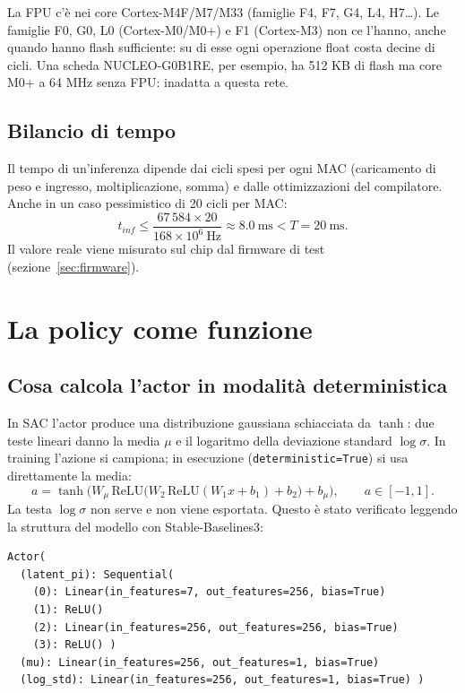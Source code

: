 \documentclass[11pt,a4paper]{article}
\newcommand{\code}[1]{\texttt{\small #1}}
\begin{document}
\begin{nota}
La FPU c'è nei core Cortex-M4F/M7/M33 (famiglie F4, F7, G4, L4, H7\dots). Le famiglie F0, G0, L0
(Cortex-M0/M0+) e F1 (Cortex-M3) non ce l'hanno, anche quando hanno flash sufficiente: su di esse
ogni operazione float costa decine di cicli. Una scheda NUCLEO-G0B1RE, per esempio, ha 512 KB di flash
ma core M0+ a 64 MHz senza FPU: inadatta a questa rete.
\end{nota}

\subsection{Bilancio di tempo}
Il tempo di un'inferenza dipende dai cicli spesi per ogni MAC (caricamento di peso e ingresso,
moltiplicazione, somma) e dalle ottimizzazioni del compilatore. Anche in un caso pessimistico di
20 cicli per MAC:
\begin{equation}
t_{inf} \le \frac{67\,584 \times 20}{168\times10^{6}\ \text{Hz}} \approx 8.0\ \text{ms} < T = 20\ \text{ms}.
\end{equation}
Il valore reale viene misurato sul chip dal firmware di test (sezione~\ref{sec:firmware}).

\section{La policy come funzione}

\subsection{Cosa calcola l'actor in modalità deterministica}
In SAC l'actor produce una distribuzione gaussiana schiacciata da $\tanh$: due teste lineari danno la
media $\mu$ e il logaritmo della deviazione standard $\log\sigma$. In training l'azione si campiona;
in esecuzione (\code{deterministic=True}) si usa direttamente la media:
\begin{equation}
a = \tanh\!\Big(W_\mu\,\mathrm{ReLU}\big(W_2\,\mathrm{ReLU}(W_1 x + b_1) + b_2\big) + b_\mu\Big), \qquad a\in[-1,1].
\end{equation}
La testa $\log\sigma$ non serve e non viene esportata. Questo è stato verificato leggendo la struttura
del modello con Stable-Baselines3:
\begin{lstlisting}[style=sh]
Actor(
  (latent_pi): Sequential(
    (0): Linear(in_features=7, out_features=256, bias=True)
    (1): ReLU()
    (2): Linear(in_features=256, out_features=256, bias=True)
    (3): ReLU() )
  (mu): Linear(in_features=256, out_features=1, bias=True)
  (log_std): Linear(in_features=256, out_features=1, bias=True) )
\end{lstlisting}
\end{document}
